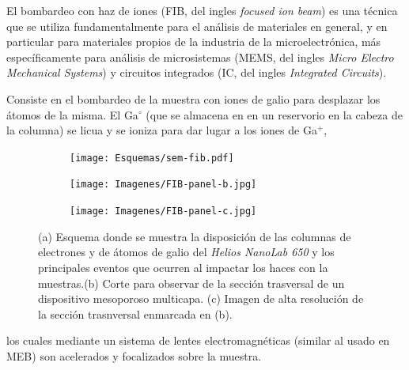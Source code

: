 		El bombardeo con haz de iones (FIB, del ingles \textit{focused ion beam}) es una técnica que se utiliza fundamentalmente para el análisis de materiales en general, y en particular para materiales propios de la industria de la microelectrónica, más específicamente para análisis de microsistemas (MEMS, del ingles \textit{Micro Electro Mechanical Systems}) y circuitos integrados (IC, del ingles \textit{Integrated Circuits}). 

		Consiste en el bombardeo de la muestra con iones de galio para desplazar los átomos de la misma. El Ga$^{\circ}$ (que se almacena en en un 
		reservorio en la cabeza de la columna) se licua y se ioniza para dar lugar a los iones de Ga${^+}$,
			\begin{figure}[hb!]
			  		  \begin{subfigure}[t]{\textwidth}
			  		  \centering\texttt{[image: Esquemas/sem-fib.pdf]}
			  		  \end{subfigure}
			  		  \begin{subfigure}[t]{0.498\textwidth}
			  		  \texttt{[image: Imagenes/FIB-panel-b.jpg]}
			  		  \end{subfigure}
			  		  \begin{subfigure}[t]{0.498\textwidth}
			  		  \texttt{[image: Imagenes/FIB-panel-c.jpg]}
			  		  \end{subfigure}
			  		  \caption[Esquema de las microscopias FIB/SEM]{(a) Esquema donde se muestra la disposición de las columnas de electrones y de átomos de galio del \textit{Helios NanoLab 650} y los principales eventos que ocurren al impactar los haces con la muestras.(b) Corte para observar de la sección trasversal de un dispositivo mesoporoso multicapa. (c) Imagen de alta resolución de la sección trasnversal enmarcada en (b).}
			  		  \label{esq:sem-fib}
			  		  \end{figure}
		 los cuales mediante un sistema de lentes electromagnéticas (similar al usado en MEB) son acelerados y focalizados sobre la muestra. 

